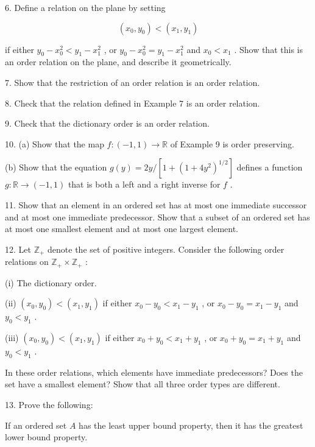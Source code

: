 6. Define a relation on the plane by setting

\[
\left( {{x}_{0},{y}_{0}}\right)  < \left( {{x}_{1},{y}_{1}}\right)
\]

if either \({y}_{0} - {x}_{0}^{2} < {y}_{1} - {x}_{1}^{2}\) , or \({y}_{0} - {x}_{0}^{2} = {y}_{1} - {x}_{1}^{2}\) and \({x}_{0} < {x}_{1}\) . Show that this is an order relation on the plane, and describe it geometrically.

7. Show that the restriction of an order relation is an order relation.

8. Check that the relation defined in Example 7 is an order relation.

9. Check that the dictionary order is an order relation.

10. (a) Show that the map \(f : \left( {-1,1}\right)  \rightarrow  \mathbb{R}\) of Example 9 is order preserving.

(b) Show that the equation \(g\left( y\right)  = {2y}/\left\lbrack  {1 + {\left( 1 + 4{y}^{2}\right) }^{1/2}}\right\rbrack\) defines a function \(g : \mathbb{R} \rightarrow  \left( {-1,1}\right)\) that is both a left and a right inverse for \(f\) .

11. Show that an element in an ordered set has at most one immediate successor and at most one immediate predecessor. Show that a subset of an ordered set has at most one smallest element and at most one largest element.

12. Let \({\mathbb{Z}}_{ + }\) denote the set of positive integers. Consider the following order relations on \({\mathbb{Z}}_{ + } \times  {\mathbb{Z}}_{ + }\) :

(i) The dictionary order.

(ii) \(\left( {{x}_{0},{y}_{0}}\right)  < \left( {{x}_{1},{y}_{1}}\right)\) if either \({x}_{0} - {y}_{0} < {x}_{1} - {y}_{1}\) , or \({x}_{0} - {y}_{0} = {x}_{1} - {y}_{1}\) and \({y}_{0} < {y}_{1}\) .

(iii) \(\left( {{x}_{0},{y}_{0}}\right)  < \left( {{x}_{1},{y}_{1}}\right)\) if either \({x}_{0} + {y}_{0} < {x}_{1} + {y}_{1}\) , or \({x}_{0} + {y}_{0} = {x}_{1} + {y}_{1}\) and \({y}_{0} < {y}_{1}\) .

In these order relations, which elements have immediate predecessors? Does the set have a smallest element? Show that all three order types are different.

13. Prove the following:

\begin{theorem} 
    If an ordered set \(A\) has the least upper bound property, then it has the greatest lower bound property.
\end{theorem}

